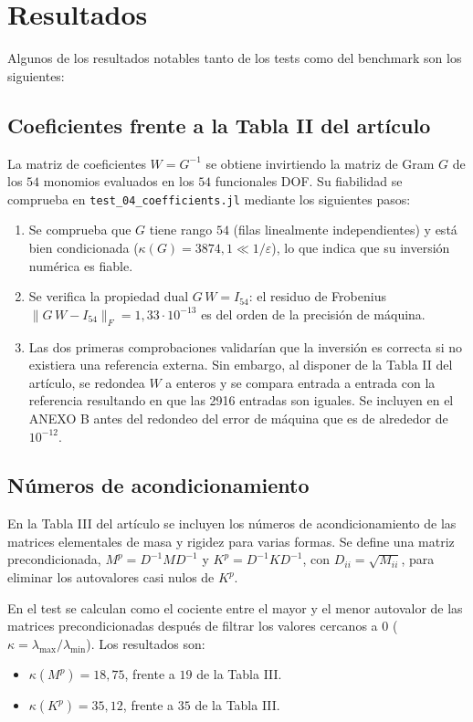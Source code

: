 \documentclass[12pt]{report} %
\begin{document}
\chapter{Resultados}\label{cap:resultados}
Algunos de los resultados notables tanto de los tests como del benchmark son los siguientes:

\section{Coeficientes frente a la Tabla II del artículo}\label{sec:res-tabla2}
La matriz de coeficientes $W = G^{-1}$ se obtiene invirtiendo la matriz de Gram $G$ de los $54$ monomios evaluados en los $54$ funcionales DOF. Su fiabilidad se comprueba en \texttt{test\_04\_coefficients.jl} mediante los siguientes pasos:
\begin{enumerate}
	\item Se comprueba que $G$ tiene rango $54$ (filas linealmente independientes) y está bien condicionada ($\kappa(G) = 3874{,}1 \ll 1/\varepsilon$), lo que indica que su inversión numérica es fiable.
	\item Se verifica la propiedad dual $G\,W = I_{54}$: el residuo de Frobenius $\|G\,W - I_{54}\|_F = 1{,}33\cdot10^{-13}$ es del orden de la precisión de máquina.
	\item Las dos primeras comprobaciones validarían que la inversión es correcta si no existiera una referencia externa. Sin embargo, al disponer de la Tabla II del artículo, se redondea $W$ a enteros y se compara entrada a entrada con la referencia resultando en que las 2916 entradas son iguales. Se incluyen en el ANEXO B antes del redondeo del error de máquina que es de alrededor de $10^{-12}$.
\end{enumerate}

\section{Números de acondicionamiento}\label{sec:res-condicion}

En la Tabla III del artículo se incluyen los números de acondicionamiento de las matrices elementales de masa y rigidez para varias formas. Se define una matriz precondicionada, $M^p = D^{-1} M D^{-1}$ y $K^p = D^{-1} K D^{-1}$, con $D_{ii} = \sqrt{M_{ii}}$, para eliminar los autovalores casi nulos de $K^p$.


En el test se calculan  como el cociente entre el mayor y el menor autovalor de las matrices precondicionadas después de filtrar los valores cercanos a 0 ($\kappa = \lambda_{\max}/\lambda_{\min}$). Los resultados son:
\begin{itemize}
	\item $\kappa(M^p) = 18{,}75$, frente a $19$ de la Tabla III.
	\item $\kappa(K^p) = 35{,}12$, frente a $35$ de la Tabla III.
\end{itemize}
\end{document}
